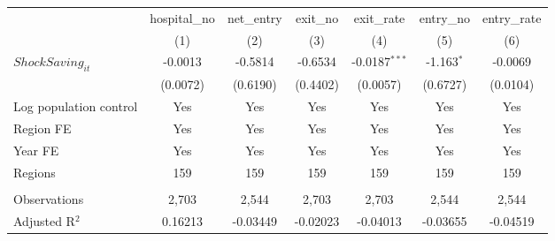 \begingroup
\centering
\begin{tabular}{lcccccc}
   \toprule
                          & hospital\_no  & net\_entry  & exit\_no  & exit\_rate      & entry\_no    & entry\_rate \\    
                          & (1)           & (2)         & (3)       & (4)             & (5)          & (6)\\  
   \midrule 
   $ShockSaving_{it}$     & -0.0013       & -0.5814     & -0.6534   & -0.0187$^{***}$ & -1.163$^{*}$ & -0.0069\\   
                          & (0.0072)      & (0.6190)    & (0.4402)  & (0.0057)        & (0.6727)     & (0.0104)\\   
   Log population control & Yes           & Yes         & Yes       & Yes             & Yes          & Yes\\  
   Region FE              & Yes           & Yes         & Yes       & Yes             & Yes          & Yes\\  
   Year FE                & Yes           & Yes         & Yes       & Yes             & Yes          & Yes\\  
   Regions                & 159           & 159         & 159       & 159             & 159          & 159\\  
    \\
   Observations           & 2,703         & 2,544       & 2,703     & 2,703           & 2,544        & 2,544\\  
   Adjusted R$^2$         & 0.16213       & -0.03449    & -0.02023  & -0.04013        & -0.03655     & -0.04519\\  
   \bottomrule
\end{tabular}
\par\endgroup

